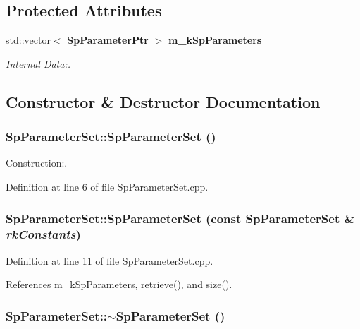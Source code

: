 \subsection*{Protected Attributes}
\begin{CompactItemize}
\item 
std::vector$<$ {\bf Sp\-Parameter\-Ptr} $>$ {\bf m\_\-k\-Sp\-Parameters}
\begin{CompactList}\small\item\em Internal Data:. \item\end{CompactList}\end{CompactItemize}


\subsection{Constructor \& Destructor Documentation}
\subsubsection{\setlength{\rightskip}{0pt plus 5cm}Sp\-Parameter\-Set::Sp\-Parameter\-Set ()}\label{classSpark_1_1SpParameterSet_a0}


Construction:. 

Definition at line 6 of file Sp\-Parameter\-Set.cpp.
\subsubsection{\setlength{\rightskip}{0pt plus 5cm}Sp\-Parameter\-Set::Sp\-Parameter\-Set (const {\bf Sp\-Parameter\-Set} \& {\em rk\-Constants})}\label{classSpark_1_1SpParameterSet_a1}


Definition at line 11 of file Sp\-Parameter\-Set.cpp.

References m\_\-k\-Sp\-Parameters, retrieve(), and size().
\subsubsection{\setlength{\rightskip}{0pt plus 5cm}Sp\-Parameter\-Set::$\sim${\bf Sp\-Parameter\-Set} ()\hspace{0.3cm}{\tt  [virtual]}}\label{classSpark_1_1SpParameterSet_a2}


